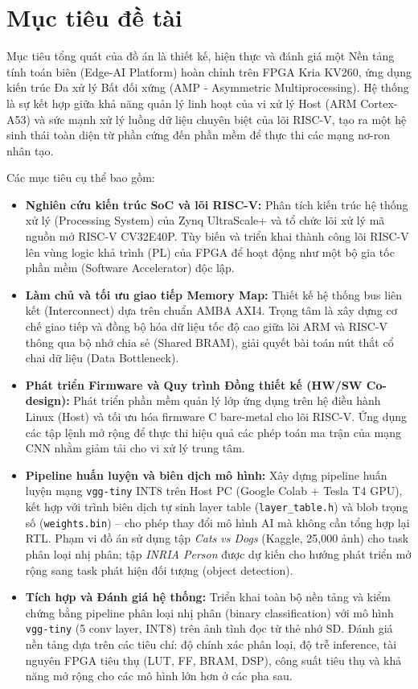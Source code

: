 \section{Mục tiêu đề tài}
Mục tiêu tổng quát của đồ án là thiết kế, hiện thực và đánh giá một Nền tảng tính toán biên (Edge-AI Platform) hoàn chỉnh trên FPGA Kria KV260, ứng dụng kiến trúc Đa xử lý Bất đối xứng (AMP - Asymmetric Multiprocessing). Hệ thống là sự kết hợp giữa khả năng quản lý linh hoạt của vi xử lý Host (ARM Cortex-A53) và sức mạnh xử lý luồng dữ liệu chuyên biệt của lõi RISC-V, tạo ra một hệ sinh thái toàn diện từ phần cứng đến phần mềm để thực thi các mạng nơ-ron nhân tạo.

Các mục tiêu cụ thể bao gồm:
\begin{itemize}
    \item \textbf{Nghiên cứu kiến trúc SoC và lõi RISC-V:} Phân tích kiến trúc hệ thống xử lý (Processing System) của Zynq UltraScale+ và tổ chức lõi xử lý mã nguồn mở RISC-V CV32E40P. Tùy biến và triển khai thành công lõi RISC-V lên vùng logic khả trình (PL) của FPGA để hoạt động như một bộ gia tốc phần mềm (Software Accelerator) độc lập.

    \item \textbf{Làm chủ và tối ưu giao tiếp Memory Map:} Thiết kế hệ thống bus liên kết (Interconnect) dựa trên chuẩn AMBA AXI4. Trọng tâm là xây dựng cơ chế giao tiếp và đồng bộ hóa dữ liệu tốc độ cao giữa lõi ARM và RISC-V thông qua bộ nhớ chia sẻ (Shared BRAM), giải quyết bài toán nút thắt cổ chai dữ liệu (Data Bottleneck).

    \item \textbf{Phát triển Firmware và Quy trình Đồng thiết kế (HW/SW Co-design):} Phát triển phần mềm quản lý lớp ứng dụng trên hệ điều hành Linux (Host) và tối ưu hóa firmware C bare-metal cho lõi RISC-V. Ứng dụng các tập lệnh mở rộng để thực thi hiệu quả các phép toán ma trận của mạng CNN nhằm giảm tải cho vi xử lý trung tâm.

    \item \textbf{Pipeline huấn luyện và biên dịch mô hình:} Xây dựng pipeline huấn luyện mạng \texttt{vgg-tiny} INT8 trên Host PC (Google Colab + Tesla T4 GPU), kết hợp với trình biên dịch tự sinh layer table (\texttt{layer\_table.h}) và blob trọng số (\texttt{weights.bin}) -- cho phép thay đổi mô hình AI mà không cần tổng hợp lại RTL. Phạm vi đồ án sử dụng tập \textit{Cats vs Dogs} (Kaggle, 25{,}000 ảnh) cho task phân loại nhị phân; tập \textit{INRIA Person} được dự kiến cho hướng phát triển mở rộng sang task phát hiện đối tượng (object detection).

    \item \textbf{Tích hợp và Đánh giá hệ thống:} Triển khai toàn bộ nền tảng và kiểm chứng bằng pipeline phân loại nhị phân (binary classification) với mô hình \texttt{vgg-tiny} (5 conv layer, INT8) trên ảnh tĩnh đọc từ thẻ nhớ SD. Đánh giá nền tảng dựa trên các tiêu chí: độ chính xác phân loại, độ trễ inference, tài nguyên FPGA tiêu thụ (LUT, FF, BRAM, DSP), công suất tiêu thụ và khả năng mở rộng cho các mô hình lớn hơn ở các pha sau.
\end{itemize}

